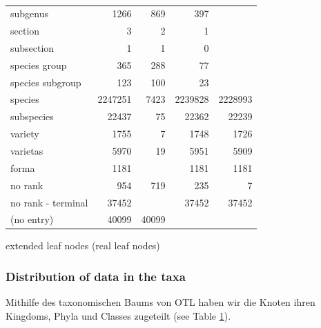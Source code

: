 \begin{table}[h!]
\begin{center}
\begin{tabular}{ |l|r||r|r|r| }
          subgenus & 1266 & 869 & 397 & \\
          section & 3 & 2 & 1 & \\
          subsection & 1 & 1 & 0 & \\
          species group & 365 & 288 & 77 & \\
          species subgroup & 123 & 100 & 23 & \\ \hline
          \setrow{\bfseries}species & 2247251 & 7423 & 2239828 & 2228993 \\
          subspecies & 22437 & 75 & 22362 & 22239 \\
          variety & 1755 & 7 & 1748 & 1726 \\
          varietas & 5970 & 19 & 5951 & 5909 \\
          forma & 1181 & & 1181 & 1181 \\
          \hline \hline
          no rank & 954 & 719 & 235 & 7 \\
          no rank - terminal & 37452 & & 37452 & 37452 \\
          (no entry) & 40099 & 40099 & & \\
          \hline  
        \end{tabular}
        \caption{}
        \label{table:...} 
      \end{center}  
    \end{table}
    extended leaf nodes (real leaf nodes)

  \subsubsection{Distribution of data in the taxa}
    Mithilfe des taxonomischen Baums von OTL haben wir die Knoten ihren Kingdoms, Phyla und Classes 
      zugeteilt (see Table \ref{table:...}). \\

